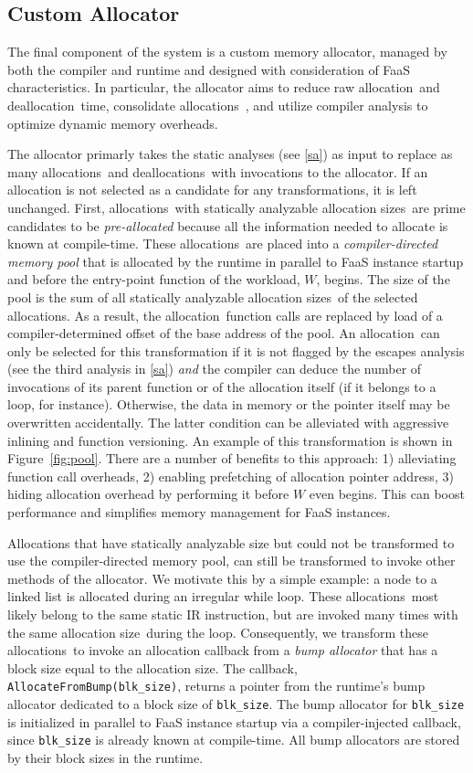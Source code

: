 \documentclass{article}
\def\ALL{allocation}
\def\DALL{deallocation}
\def\ALLS{allocations}
\def\DALLS{deallocations}
\def\SIZE{allocation size}
\def\SIZES{allocation sizes}
\begin{document}
\subsection{Custom Allocator} \label{ca}
The final component of the system is a custom memory allocator, managed by both
the compiler and runtime and designed with consideration of FaaS characteristics.
In particular, the allocator aims to reduce raw \ALL\ and \DALL\ time, consolidate 
\ALLS\ , and utilize compiler analysis to optimize dynamic memory overheads. 

The allocator primarly takes the static analyses (see \ref{sa})
as input to replace as many \ALLS\ and \DALLS\ with invocations to the allocator. If
an allocation is not selected as a candidate for any transformations, it is left unchanged.
First, \ALLS\ with statically analyzable \SIZES\ are prime candidates to be 
\textit{pre-allocated} because all the information needed to allocate is known at
compile-time. These \ALLS\ are placed into a \textit{compiler-directed memory pool} that is
allocated by the runtime in parallel to FaaS instance startup and before the entry-point function 
of the workload, $W$, begins. The size of the pool is the sum of all statically 
analyzable \SIZES\ of the selected \ALLS . As a result, the \ALL\ function calls are 
replaced by load of a compiler-determined offset of the base address of the pool.
An \ALL\ can only be selected for this transformation if it is not flagged by 
the escapes analysis (see the third analysis in \ref{sa}) \textit{and} the compiler 
can deduce the number of invocations of its parent function or of the allocation
itself (if it belongs to a loop, for instance). Otherwise, the data
in memory or the pointer itself may be overwritten accidentally. The latter condition
can be alleviated with aggressive inlining and function versioning. An example of 
this transformation is shown in Figure~\ref{fig:pool}. There are a number of 
benefits to this approach: 1) alleviating function call overheads, 2) enabling 
prefetching of allocation pointer address, 3) hiding allocation overhead by performing 
it before $W$ even begins. This can boost performance and simplifies memory management
for FaaS instances. 

Allocations that have statically analyzable size but could not be transformed to
use the compiler-directed memory pool, can still be transformed to invoke other
methods of the allocator. We motivate this by a simple example: a node 
to a linked list is allocated during an irregular while loop. These \ALLS\ most
likely belong to the same static IR instruction, but are invoked many times with
the same \SIZE\ during the loop. Consequently, we transform these \ALLS\ to 
invoke an allocation callback from a \textit{bump allocator} that has a block size equal to the 
\SIZE . The callback, \texttt{AllocateFromBump(blk\_size)}, returns a pointer from the
runtime's bump allocator dedicated to a block size of \texttt{blk\_size}. The bump allocator
for \texttt{blk\_size} is initialized in parallel to FaaS instance startup via 
a compiler-injected callback, since \texttt{blk\_size} is already known at compile-time.
All bump allocators are stored by their block sizes in the runtime.
\end{document}
